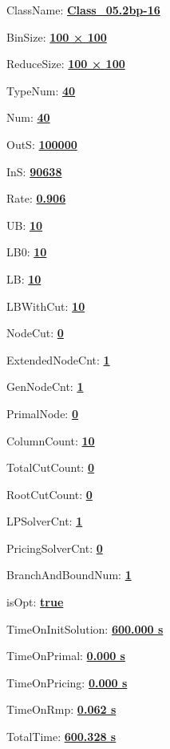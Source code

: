 \documentclass[11pt]{article}
\begin{document}
\pagestyle{empty}


ClassName: \underline{\textbf{Class_05.2bp-16}}
\par
BinSize: \underline{\textbf{100 × 100}}
\par
ReduceSize: \underline{\textbf{100 × 100}}
\par
TypeNum: \underline{\textbf{40}}
\par
Num: \underline{\textbf{40}}
\par
OutS: \underline{\textbf{100000}}
\par
InS: \underline{\textbf{90638}}
\par
Rate: \underline{\textbf{0.906}}
\par
UB: \underline{\textbf{10}}
\par
LB0: \underline{\textbf{10}}
\par
LB: \underline{\textbf{10}}
\par
LBWithCut: \underline{\textbf{10}}
\par
NodeCut: \underline{\textbf{0}}
\par
ExtendedNodeCnt: \underline{\textbf{1}}
\par
GenNodeCnt: \underline{\textbf{1}}
\par
PrimalNode: \underline{\textbf{0}}
\par
ColumnCount: \underline{\textbf{10}}
\par
TotalCutCount: \underline{\textbf{0}}
\par
RootCutCount: \underline{\textbf{0}}
\par
LPSolverCnt: \underline{\textbf{1}}
\par
PricingSolverCnt: \underline{\textbf{0}}
\par
BranchAndBoundNum: \underline{\textbf{1}}
\par
isOpt: \underline{\textbf{true}}
\par
TimeOnInitSolution: \underline{\textbf{600.000 s}}
\par
TimeOnPrimal: \underline{\textbf{0.000 s}}
\par
TimeOnPricing: \underline{\textbf{0.000 s}}
\par
TimeOnRmp: \underline{\textbf{0.062 s}}
\par
TotalTime: \underline{\textbf{600.328 s}}
\par
\newpage


\end{document}
